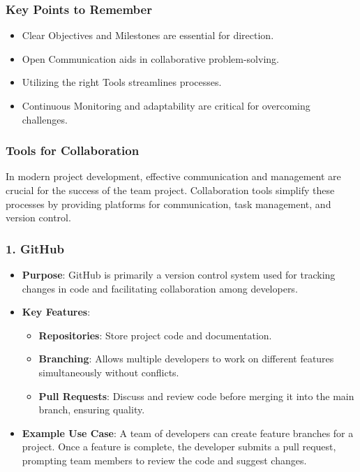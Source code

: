\documentclass[aspectratio=169]{beamer}
\begin{document}
\begin{frame}[fragile]
    \frametitle{Key Points to Remember}
    \begin{itemize}
        \item Clear Objectives and Milestones are essential for direction.
        \item Open Communication aids in collaborative problem-solving.
        \item Utilizing the right Tools streamlines processes.
        \item Continuous Monitoring and adaptability are critical for overcoming challenges.
    \end{itemize}
\end{frame}

\begin{frame}[fragile]
    \frametitle{Tools for Collaboration}
    In modern project development, effective communication and management are crucial for the success of the team project. Collaboration tools simplify these processes by providing platforms for communication, task management, and version control.
\end{frame}

\begin{frame}[fragile]
    \frametitle{1. GitHub}
    \begin{itemize}
        \item \textbf{Purpose}: GitHub is primarily a version control system used for tracking changes in code and facilitating collaboration among developers.
        \item \textbf{Key Features}:
        \begin{itemize}
            \item \textbf{Repositories}: Store project code and documentation.
            \item \textbf{Branching}: Allows multiple developers to work on different features simultaneously without conflicts.
            \item \textbf{Pull Requests}: Discuss and review code before merging it into the main branch, ensuring quality.
        \end{itemize}
        \item \textbf{Example Use Case}: A team of developers can create feature branches for a project. Once a feature is complete, the developer submits a pull request, prompting team members to review the code and suggest changes.
    \end{itemize}
\end{frame}
\end{document}
